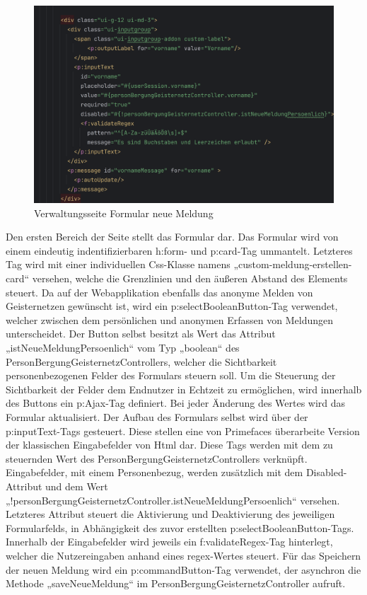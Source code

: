 \documentclass[11pt]{article}
\begin{document}
    \newpage
    \begin{figure}[H]
        \centering
        \includegraphics[width=\textwidth]{abbildungen/Verwaltungsseite-Xhtml-Formular.png}
        \caption{Verwaltungsseite Formular neue Meldung}
        \label{verwaltungsseite-formular}
    \end{figure} 

    Den ersten Bereich der Seite stellt das Formular dar. Das Formular wird von einem eindeutig indentifizierbaren h:form- und p:card-Tag ummantelt. Letzteres Tag wird mit einer individuellen Css-Klasse namens „custom-meldung-erstellen-card“ versehen, welche die Grenzlinien und den äußeren Abstand des Elements steuert.
    Da auf der Webapplikation ebenfalls das anonyme Melden von Geisternetzen gewünscht ist, wird ein p:selectBooleanButton-Tag verwendet, welcher zwischen dem persönlichen und anonymen Erfassen von Meldungen unterscheidet.
    Der Button selbst besitzt als Wert das Attribut „istNeueMeldungPersoenlich“ vom Typ „boolean“ des PersonBergungGeisternetzControllers, welcher die Sichtbarkeit personenbezogenen Felder des Formulars steuern soll.
    Um die Steuerung der Sichtbarkeit der Felder dem Endnutzer in Echtzeit zu ermöglichen, wird innerhalb des Buttons ein p:Ajax-Tag definiert. Bei jeder Änderung des Wertes wird das Formular aktualisiert.
    Der Aufbau des Formulars selbst wird über der p:inputText-Tags gesteuert. Diese stellen eine von Primefaces überarbeite Version der klassischen Eingabefelder von Html dar.
    Diese Tags werden mit dem zu steuernden Wert des PersonBergungGeisternetzControllers verknüpft. Eingabefelder, mit einem Personenbezug, werden zusätzlich mit dem Disabled-Attribut und dem Wert „!personBergungGeisternetzController.istNeueMeldungPersoenlich“ versehen.
    Letzteres Attribut steuert die Aktivierung und Deaktivierung des jeweiligen Formularfelds, in Abhängigkeit des zuvor erstellten p:selectBooleanButton-Tags.
    Innerhalb der Eingabefelder wird jeweils ein f:validateRegex-Tag hinterlegt, welcher die Nutzereingaben anhand eines \gls{regex}-Wertes steuert.
    Für das Speichern der neuen Meldung wird ein p:commandButton-Tag verwendet, der asynchron die Methode „saveNeueMeldung“ im PersonBergungGeisternetzController aufruft.  
    
\end{document}
